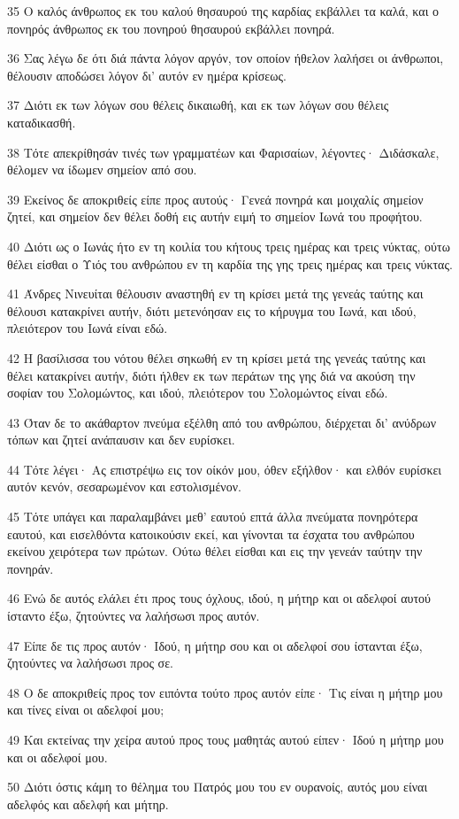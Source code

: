 \par 35 Ο καλός άνθρωπος εκ του καλού θησαυρού της καρδίας εκβάλλει τα καλά, και ο πονηρός άνθρωπος εκ του πονηρού θησαυρού εκβάλλει πονηρά.
\par 36 Σας λέγω δε ότι διά πάντα λόγον αργόν, τον οποίον ήθελον λαλήσει οι άνθρωποι, θέλουσιν αποδώσει λόγον δι' αυτόν εν ημέρα κρίσεως.
\par 37 Διότι εκ των λόγων σου θέλεις δικαιωθή, και εκ των λόγων σου θέλεις καταδικασθή.
\par 38 Τότε απεκρίθησάν τινές των γραμματέων και Φαρισαίων, λέγοντες· Διδάσκαλε, θέλομεν να ίδωμεν σημείον από σου.
\par 39 Εκείνος δε αποκριθείς είπε προς αυτούς· Γενεά πονηρά και μοιχαλίς σημείον ζητεί, και σημείον δεν θέλει δοθή εις αυτήν ειμή το σημείον Ιωνά του προφήτου.
\par 40 Διότι ως ο Ιωνάς ήτο εν τη κοιλία του κήτους τρεις ημέρας και τρεις νύκτας, ούτω θέλει είσθαι ο Υιός του ανθρώπου εν τη καρδία της γης τρεις ημέρας και τρεις νύκτας.
\par 41 Άνδρες Νινευίται θέλουσιν αναστηθή εν τη κρίσει μετά της γενεάς ταύτης και θέλουσι κατακρίνει αυτήν, διότι μετενόησαν εις το κήρυγμα του Ιωνά, και ιδού, πλειότερον του Ιωνά είναι εδώ.
\par 42 Η βασίλισσα του νότου θέλει σηκωθή εν τη κρίσει μετά της γενεάς ταύτης και θέλει κατακρίνει αυτήν, διότι ήλθεν εκ των περάτων της γης διά να ακούση την σοφίαν του Σολομώντος, και ιδού, πλειότερον του Σολομώντος είναι εδώ.
\par 43 Όταν δε το ακάθαρτον πνεύμα εξέλθη από του ανθρώπου, διέρχεται δι' ανύδρων τόπων και ζητεί ανάπαυσιν και δεν ευρίσκει.
\par 44 Τότε λέγει· Ας επιστρέψω εις τον οίκόν μου, όθεν εξήλθον· και ελθόν ευρίσκει αυτόν κενόν, σεσαρωμένον και εστολισμένον.
\par 45 Τότε υπάγει και παραλαμβάνει μεθ' εαυτού επτά άλλα πνεύματα πονηρότερα εαυτού, και εισελθόντα κατοικούσιν εκεί, και γίνονται τα έσχατα του ανθρώπου εκείνου χειρότερα των πρώτων. Ούτω θέλει είσθαι και εις την γενεάν ταύτην την πονηράν.
\par 46 Ενώ δε αυτός ελάλει έτι προς τους όχλους, ιδού, η μήτηρ και οι αδελφοί αυτού ίσταντο έξω, ζητούντες να λαλήσωσι προς αυτόν.
\par 47 Είπε δε τις προς αυτόν· Ιδού, η μήτηρ σου και οι αδελφοί σου ίστανται έξω, ζητούντες να λαλήσωσι προς σε.
\par 48 Ο δε αποκριθείς προς τον ειπόντα τούτο προς αυτόν είπε· Τις είναι η μήτηρ μου και τίνες είναι οι αδελφοί μου;
\par 49 Και εκτείνας την χείρα αυτού προς τους μαθητάς αυτού είπεν· Ιδού η μήτηρ μου και οι αδελφοί μου.
\par 50 Διότι όστις κάμη το θέλημα του Πατρός μου του εν ουρανοίς, αυτός μου είναι αδελφός και αδελφή και μήτηρ.

